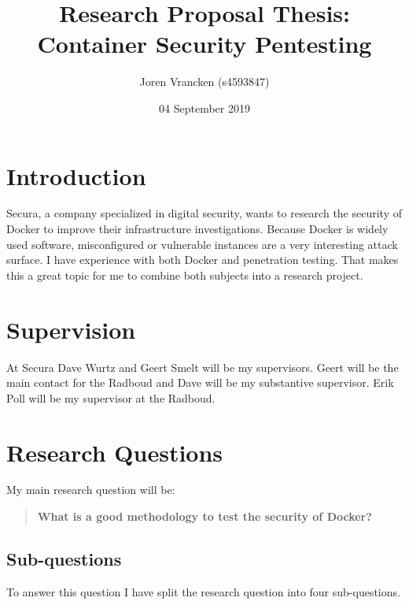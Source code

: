 \documentclass{article}
\title{Research Proposal Thesis:\\Container Security Pentesting}
\author{Joren Vrancken (s4593847)}
\date{04 September 2019}
\begin{document}
\maketitle

\section{Introduction}
Secura, a company specialized in digital security, wants to research the security of Docker to improve their infrastructure investigations. Because Docker is widely used software, misconfigured or vulnerable instances are a very interesting attack surface. I have experience with both Docker and penetration testing. That makes this a great topic for me to combine both subjects into a research project.

\section{Supervision}
At Secura Dave Wurtz and Geert Smelt will be my supervisors. Geert will be the main contact for the Radboud and Dave will be my substantive supervisor. Erik Poll will be my supervisor at the Radboud.

\section{Research Questions}
My main research question will be:
\begin{quote}
    \textbf{What is a good methodology to test the security of Docker?}
\end{quote}

\subsection{Sub-questions}
To answer this question I have split the research question into four sub-questions. 
\end{document}
